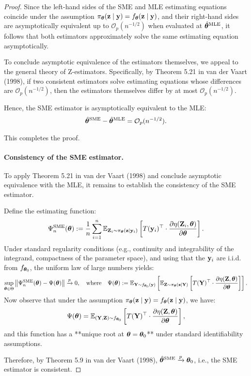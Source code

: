 \documentclass[twoside,11pt]{article}
\begin{document}
\begin{proof}
{\color{red}
Since the left-hand sides of the SME and MLE estimating equations coincide under the assumption \( \pi_{\bm{\theta}}({\bf z} \mid {\bf y}) = f_{\bm{\theta}}({\bf z} \mid {\bf y}) \), and their right-hand sides are asymptotically equivalent up to \( \mathcal{O}_p(n^{-1/2}) \) when evaluated at \( \hat{{\bm{\theta}}}^{\text{MLE}} \), it follows that both estimators approximately solve the same estimating equation asymptotically.

To conclude asymptotic equivalence of the estimators themselves, we appeal to the general theory of Z-estimators. Specifically, by Theorem 5.21 in van der Vaart (1998), if two consistent estimators solve estimating equations whose differences are \( \mathcal{O}_p(n^{-1/2}) \), then the estimators themselves differ by at most \( \mathcal{O}_p(n^{-1/2}) \).

Hence, the SME estimator is asymptotically equivalent to the MLE:
\[
\hat{{\bm{\theta}}}^{\text{SME}} - \hat{{\bm{\theta}}}^{\text{MLE}} = \mathcal{O}_p(n^{-1/2}).
\]

This completes the proof.

}


{\color{blue}
\paragraph{Consistency of the SME estimator.}
To apply Theorem 5.21 in van der Vaart (1998) and conclude asymptotic equivalence with the MLE, it remains to establish the consistency of the SME estimator.

Define the estimating function:
\[
\Psi_n^{\text{SME}}({\bm{\theta}}) := \frac{1}{n} \sum_{i=1}^n \mathbb{E}_{{\bf Z}_i \sim \pi_{\bm{\theta}}({\bf z} \mid {\bf y}_i)} \left[ T({\bf y}_i)^\top \cdot \frac{\partial \eta({\bf Z}_i, {\bm{\theta}})}{\partial {\bm{\theta}}} \right].
\]
Under standard regularity conditions (e.g., continuity and integrability of the integrand, compactness of the parameter space), and using that the \( {\bf y}_i \) are i.i.d. from \( f_{{\bm{\theta}}_0} \), the uniform law of large numbers yields:
\[
\sup_{{\bm{\theta}} \in \Theta} \left\| \Psi_n^{\text{SME}}({\bm{\theta}}) - \Psi({\bm{\theta}}) \right\| \xrightarrow{p} 0,
\quad \text{where} \quad
\Psi({\bm{\theta}}) := \mathbb{E}_{{\bf Y} \sim f_{{\bm{\theta}}_0}({\bf y})} \left[ \mathbb{E}_{{\bf Z} \sim \pi_{\bm{\theta}}({\bf z} \mid {\bf Y})} \left[ T({\bf Y})^\top \cdot \frac{\partial \eta({\bf Z}, {\bm{\theta}})}{\partial {\bm{\theta}}} \right] \right].
\]
Now observe that under the assumption \( \pi_{\bm{\theta}}({\bf z} \mid {\bf y}) = f_{\bm{\theta}}({\bf z} \mid {\bf y}) \), we have:
\[
\Psi({\bm{\theta}}) = \mathbb{E}_{({\bf Y}, {\bf Z}) \sim f_{{\bm{\theta}}_0}} \left[ T({\bf Y})^\top \cdot \frac{\partial \eta({\bf Z}, {\bm{\theta}})}{\partial {\bm{\theta}}} \right],
\]
and this function has a **unique root at \( {\bm{\theta}} = {\bm{\theta}}_0 \)** under standard identifiability assumptions.

Therefore, by Theorem 5.9 in van der Vaart (1998), \( \hat{{\bm{\theta}}}^{\text{SME}} \xrightarrow{p} {\bm{\theta}}_0 \), i.e., the SME estimator is consistent.

}
\end{proof}
\end{document}
